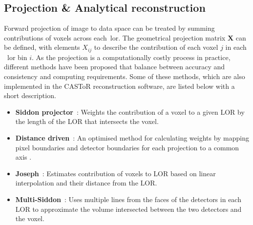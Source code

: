 %
\subsection{Projection \& Analytical reconstruction}
Forward projection of image to data space can be treated by summing contributions of voxels across each~\gls{lor}. %
The geometrical projection matrix $\bm{X}$ can be defined, with elements $X_{ij}$ to describe the contribution of each voxel $j$ in each ~\gls{lor} bin $i$. As the projection is a computationally costly process in practice, different methods have been proposed that balance between accuracy and consistency and computing requirements. %
Some of these methods, which are also implemented in the CASToR reconstruction software, are listed below with a short description.
\begin{itemize}
\item  \textbf{Siddon projector}~\cite{Siddon1985}: Weights the contribution of a voxel to a given LOR by the length of the LOR that intersects the voxel.
\item  \textbf{Distance driven}~\cite{DeMan2004}: An optimised method for calculating weights by mapping pixel boundaries and detector boundaries for each projection to a common axis .
\item  \textbf{Joseph}~\cite{Joseph1982}: Estimates contribution of voxels to LOR based on linear interpolation and their distance from the LOR. 
\item  \textbf{Multi-Siddon}~\cite{Moehrs2008}: Uses multiple lines from the faces of the detectors in each LOR to approximate the volume intersected between the two detectors and the voxel.
\end{itemize}

